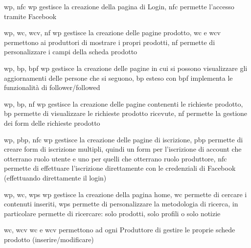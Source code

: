 {\acrlong{wp}, \acrlong{nfc}}
{\acrlong{wp} gestisce la creazione della pagina di Login, \acrlong{nfc} permette l'accesso tramite Facebook}


{\acrlong{wp}, \acrlong{wc}, \acrlong{wcv}, \acrlong{nf}}
{\acrlong{wp} gestisce la creazione delle pagine prodotto, \acrlong{wc} e \acrlong{wcv} permettono ai produttori di mostrare i propri prodotti, \acrlong{nf} permette di personalizzare i campi della scheda prodotto}


{\acrlong{wp}, \acrlong{bp}, \acrlong{bpf}}
{\acrlong{wp} gestisce la creazione delle pagine in cui si possono visualizzare gli aggiornamenti delle persone che si seguono, \acrlong{bp} esteso con \acrlong{bpf} implementa le funzionalità di follower/followed}


{\acrlong{wp}, \acrlong{bp}, \acrlong{nf}}
{\acrlong{wp} gestisce la creazione delle pagine contenenti le richieste prodotto, \acrlong{bp} permette di visualizzare le richieste prodotto ricevute, \acrlong{nf} permette la gestione dei form delle richieste prodotto}


{\acrlong{wp}, \acrlong{pbp}, \acrlong{nfc}}
{\acrlong{wp} gestisce la creazione delle pagine di iscrizione, \acrlong{pbp} permette di creare form di iscrizione multipli, quindi un form per l'iscrizione di account che otterrano ruolo utente e uno per quelli che otterrano ruolo produttore, \acrlong{nfc} permette di effettuare l'iscrizione direttamente con le credenziali di Facebook (effettuando direttamente il login)}


{\acrlong{wp}, \acrlong{wc}, \acrlong{wps}}
{\acrlong{wp} gestisce la creazione della pagina home, \acrlong{wc} permette di cercare i contenuti inseriti, \acrlong{wps} permette di personalizzare la metodologia di ricerca, in particolare permette di ricercare: solo prodotti, solo profili o solo notizie}


{\acrlong{wc}, \acrlong{wcv}}
{\acrlong{wc} e \acrlong{wcv} permettono ad ogni Produttore di gestire le proprie schede prodotto (inserire/modificare)}


